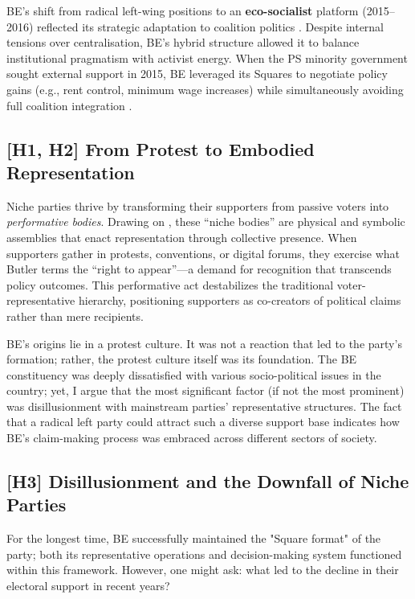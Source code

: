 BE’s shift from radical left-wing positions to an \textbf{eco-socialist} platform (2015–2016) reflected its strategic adaptation to coalition politics \parencite[136]{lisi2009}. Despite internal tensions over centralisation, BE’s hybrid structure allowed it to balance institutional pragmatism with activist energy. When the PS minority government sought external support in 2015, BE leveraged its Squares to negotiate policy gains (e.g., rent control, minimum wage increases) while simultaneously avoiding full coalition integration \parencite[15]{lisi2016}.


\subsection{[H1, H2] From Protest to Embodied Representation}

Niche parties thrive by transforming their supporters from passive voters into \textit{performative bodies}. Drawing on \cite{kim2024}, these “niche bodies” are physical and symbolic assemblies that enact representation through collective presence. When supporters gather in protests, conventions, or digital forums, they exercise what Butler terms the \enquote{right to appear}—a demand for recognition that transcends policy outcomes. This performative act destabilizes the traditional voter-representative hierarchy, positioning supporters as co-creators of political claims rather than mere recipients.

BE’s origins lie in a protest culture. It was not a reaction that led to the party’s formation; rather, the protest culture itself was its foundation. The BE constituency was deeply dissatisfied with various socio-political issues in the country; yet, I argue that the most significant factor (if not the most prominent) was disillusionment with mainstream parties' representative structures. The fact that a radical left party could attract such a diverse support base indicates how BE’s claim-making process was embraced across different sectors of society.

\subsection{[H3] Disillusionment and the Downfall of Niche Parties}

For the longest time, BE successfully maintained the "Square format" of the party; both its representative operations and decision-making system functioned within this framework. However, one might ask: what led to the decline in their electoral support in recent years?

